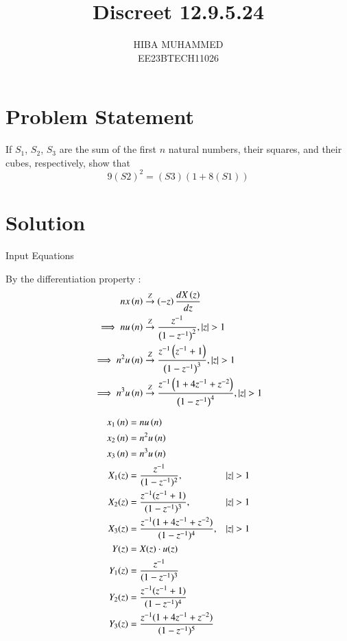 \documentclass[journal,12pt,onecolumn]{IEEEtran}
\newcommand{\system}[1]{\stackrel{#1}{\rightarrow}}
\theoremstyle{remark}
\begin{document}
\let\vec\mathbf



\title{Discreet 12.9.5.24}
\author{HIBA MUHAMMED\\
        EE23BTECH11026}
\maketitle

\section*{Problem Statement}
If \(S_1\), \(S_2\), \(S_3\) are the sum of the first \(n\) natural numbers, their squares, and their cubes, respectively, show that 
\[ 9(S\scriptstyle 2)^2 = (S\scriptstyle 3)(1 + 8(S\scriptstyle 1)) \]

\section*{Solution}
\begin{table}[h]
  \centering
  
  \caption{Input Equations}
  \label{tab:input-equations}
  
\end{table}
 By the differentiation property :
    \begin{align}
     n x\brak{n} & \system{Z} \brak{-z} \frac{dX\brak{z}}{dz} \label{eq:11.9.5.26.1}\\
    \implies    n u\brak{n} & \system{Z} \frac{z^{-1}}{\brak{1-z^{-1}}^2} ,   \abs{z} >1 \label{eq:11.9.5.26.2}\\
    \implies     n^2 u\brak{n} & \system{Z} \frac{z^{-1}\brak{z^{-1}+1}}{\brak{1-z^{-1}}^3} ,  \abs{z} > 1\label{eq:11.9.5.26.3}\\
    \implies     n^3 u\brak{n} & \system{Z} \frac{z^{-1}\brak{1+4z^{-1}+z^{-2}}}{\brak{1-z^{-1}}^4} ,   \abs{z} >1\label{eq:11.9.5.26.4} \\
    \end{align}
    
\begin{align}
    x_1\left( n \right) &= n u\left( n \right) \\
    x_2\left( n \right) &= n^2 u\left( n \right) \\
    x_3\left( n \right) &= n^3 u\left( n \right)\\
    X_1(z) &= \frac{z^{-1}}{(1-z^{-1})^2}, &|z| > 1 \\
    X_2(z) &= \frac{z^{-1}(z^{-1}+1)}{(1-z^{-1})^3}, &|z| > 1 \\
    X_3(z) &= \frac{z^{-1}(1+4z^{-1}+z^{-2})}{(1-z^{-1})^4}, &|z| > 1 \\
    Y(z) &= X(z) \cdot u(z) \\
    Y_1(z) &= \frac{z^{-1}}{(1-z^{-1})^3} \\
    Y_2(z) &= \frac{z^{-1}(z^{-1}+1)}{(1-z^{-1})^4} \\
    Y_3(z) &= \frac{z^{-1}(1+4z^{-1}+z^{-2})}{(1-z^{-1})^5}\\
\end{align} 
    
\end{document}
